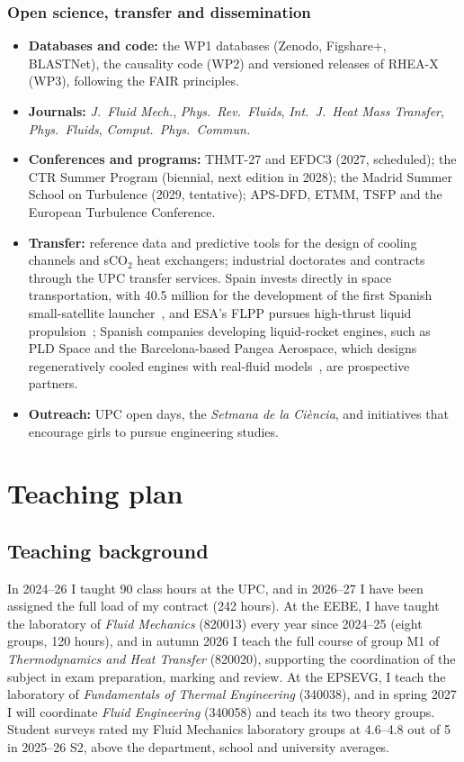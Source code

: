 \documentclass[11pt]{article}
\begin{document}
\subsubsection{Open science, transfer and dissemination}

\begin{itemize}
  \item \textbf{Databases and code:} the WP1 databases (Zenodo, Figshare+, BLASTNet), the
  causality code (WP2) and versioned releases of RHEA-X (WP3), following the FAIR principles.
  \item \textbf{Journals:} \emph{J.\ Fluid Mech.}, \emph{Phys.\ Rev.\ Fluids}, \emph{Int.\ J.\
  Heat Mass Transfer}, \emph{Phys.\ Fluids}, \emph{Comput.\ Phys.\ Commun.}
  \item \textbf{Conferences and programs:} THMT-27 and EFDC3 (2027, scheduled); the CTR Summer
  Program (biennial, next edition in 2028); the Madrid Summer School on Turbulence (2029,
  tentative); APS-DFD, ETMM, TSFP and the European Turbulence Conference.
  \item \textbf{Transfer:} reference data and predictive tools for the design of cooling
  channels and sCO$_2$ heat exchangers; industrial doctorates and contracts through the UPC
  transfer services. Spain invests directly in space transportation, with \texteuro{}40.5
  million for the development of the first Spanish small-satellite launcher~\cite{CDTI2024},
  and ESA's FLPP pursues high-thrust liquid propulsion~\cite{ESA2026}; Spanish companies
  developing liquid-rocket engines, such as PLD Space and the Barcelona-based Pangea Aerospace,
  which designs regeneratively cooled engines with real-fluid models~\cite{Esnault2021}, are
  prospective partners.
  \item \textbf{Outreach:} UPC open days, the \emph{Setmana de la Ci\`encia}, and initiatives
  that encourage girls to pursue engineering studies.
\end{itemize}

\section{Teaching plan}\label{sec:teaching}

\subsection{Teaching background}
In 2024--26 I taught 90 class hours at the UPC, and in 2026--27 I have been assigned the full
load of my contract (242 hours). At the EEBE, I have taught the laboratory of \emph{Fluid
Mechanics} (820013) every year since 2024--25 (eight groups, 120 hours), and in autumn
2026 I teach the full course of group M1 of \emph{Thermodynamics and Heat Transfer}
(820020), supporting the coordination of the subject in exam preparation, marking and
review. At the EPSEVG, I teach the laboratory of \emph{Fundamentals of Thermal
Engineering} (340038), and in spring 2027 I will coordinate \emph{Fluid Engineering}
(340058) and teach its two theory groups. Student surveys rated my Fluid Mechanics
laboratory groups at 4.6--4.8 out of 5 in 2025--26 S2, above the department, school and
university averages.
\end{document}
